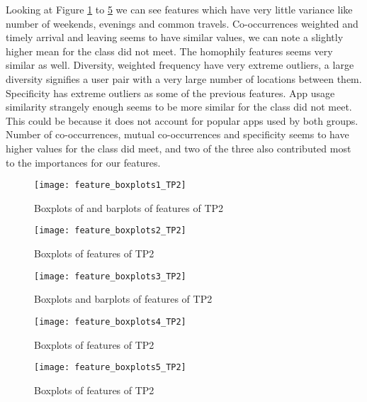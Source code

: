 Looking at Figure \ref{fig:feature_boxplots1} to \ref{fig:feature_boxplots5} we can see features which have very little variance like number of weekends, evenings and common travels. Co-occurrences weighted and timely arrival and leaving seems to have similar values, we can note a slightly higher mean for the class did not meet. The homophily features seems very similar as well. Diversity, weighted frequency have very extreme outliers, a large diversity signifies a user pair with a very large number of locations between them. Specificity has extreme outliers as some of the previous features. App usage similarity strangely enough seems to be more similar for the class did not meet. This could be because it does not account for popular apps used by both groups. Number of co-occurrences, mutual co-occurrences and specificity seems to have higher values for the class did meet, and two of the three also contributed most to the importances for our features.

\begin{figure}[H]
    \hspace*{-1.0cm}
    \centering
    \texttt{[image: feature\_boxplots1\_TP2]}
    \caption{Boxplots of and barplots of features of TP2}
    \label{fig:feature_boxplots1}
\end{figure}

\begin{figure}[H]
    \hspace*{-1.0cm}
    \centering
    \texttt{[image: feature\_boxplots2\_TP2]}
    \caption{Boxplots of features of TP2}
    \label{fig:feature_boxplots2}
\end{figure}
\begin{figure}[H]
    \hspace*{-1.0cm}
    \centering
    \texttt{[image: feature\_boxplots3\_TP2]}
    \caption{Boxplots and barplots of features of TP2}
    \label{fig:feature_boxplots3}
\end{figure}
\begin{figure}[H]
    \hspace*{-1.0cm}
    \centering
    \texttt{[image: feature\_boxplots4\_TP2]}
    \caption{Boxplots of features of TP2}
    \label{fig:feature_boxplots4}
\end{figure}
\begin{figure}[H]
    \hspace*{-1.0cm}
    \centering
    \texttt{[image: feature\_boxplots5\_TP2]}
    \caption{Boxplots of features of TP2}
    \label{fig:feature_boxplots5}
\end{figure}


